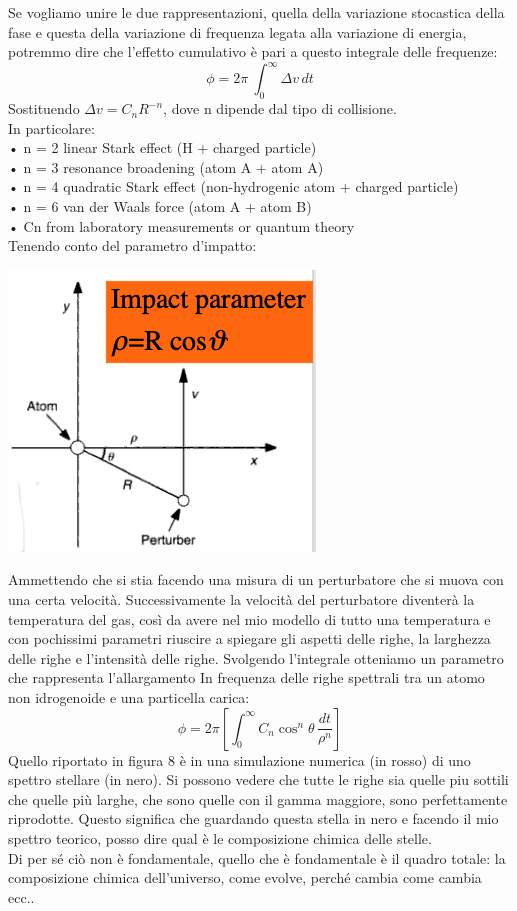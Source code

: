 \documentclass[a4paper,11pt]{article}
\begin{document}
 Se vogliamo unire le due rappresentazioni, quella della variazione stocastica della fase e questa della variazione di frequenza legata alla variazione di energia, potremmo dire che l'effetto cumulativo è pari a questo integrale delle frequenze:
$$
 \phi =2\pi\ \int_{0}^{\infty} \Delta v \,dt
$$
 Sostituendo  $ \Delta v=C_{n} R^{-n} $, dove n dipende dal tipo di collisione.\\ In particolare:\\•	n = 2 linear Stark effect (H + charged particle)
\\
 •	n = 3 resonance broadening (atom A + atom A)
\\
 •	n = 4 quadratic Stark effect  (non-hydrogenic atom + charged particle)
\\
 •	n = 6 van der Waals force (atom A + atom B)
\\
 •	Cn from laboratory measurements or quantum theory
\\
 Tenendo conto del parametro d’impatto:\\
 \begin{center}
 	\includegraphics{impatto}
 \end{center}
Ammettendo che si stia facendo una misura di un perturbatore che si muova con una certa velocità. Successivamente la velocità del perturbatore diventerà  la temperatura del gas, così da avere nel mio modello di tutto una temperatura e con pochissimi parametri riuscire a spiegare gli aspetti delle righe, la larghezza delle righe e l'intensità delle righe. 
Svolgendo l’integrale otteniamo un parametro che rappresenta  l'allargamento In frequenza delle righe spettrali tra un atomo non idrogenoide e una particella carica:
	\begin{equation}
	\phi =2\pi\left[ \int_{0}^{\infty} C_{n} \cos^{n} \theta \,\frac{dt}{\rho^{n}} \right]
\end{equation}
Quello riportato in figura 8 è in una simulazione numerica (in rosso) di uno spettro stellare (in nero). Si possono vedere che tutte le righe sia quelle piu sottili che quelle più larghe, che sono quelle con il gamma maggiore, sono perfettamente riprodotte.
Questo significa che guardando questa stella in nero e facendo il mio spettro teorico, posso dire qual è  le composizione chimica delle stelle. \\Di per sé ciò non è fondamentale, quello che è fondamentale è il quadro totale: la composizione chimica dell'universo, come evolve, perché cambia come cambia ecc..
\end{document}
